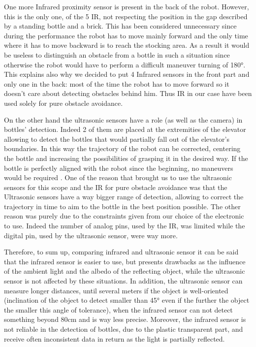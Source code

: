 One more Infrared proximity sensor is present in the back of the robot.
However, this is the only one, of the 5 IR, not respecting the position in the gap described by a standing bottle and a brick.
This has been considered unnecessary since during the performance the robot has to move mainly forward and the only time where it has to move backward is to reach the stocking area. As a result it would be useless to distinguish an obstacle from a bottle in such a situation since otherwise the robot would have to perform a difficult maneuver turning of 180°.
This explains also why we decided to put 4 Infrared sensors in the front part and only one in the back: most of the time the robot has to move forward so it doesn’t care about detecting obstacles behind him.
Thus IR in our case have been used solely for pure obstacle avoidance.

On the other hand the ultrasonic sensors have a role (as well as the camera) in bottles’ detection.
Indeed 2 of them are placed at the extremities of the elevator allowing to detect the bottles that would partially fall out of the elevator’s boundaries. In this way the trajectory of the robot can be corrected, centering the bottle and increasing the possibilities of grasping it in the desired way.
If the bottle is perfectly aligned with the robot since the beginning, no maneuvers would be required .
One of the reason that brought us to use the ultrasonic sensors for this scope and the IR for pure obstacle avoidance was that the Ultrasonic sensors have a way bigger range of detection, allowing to correct the trajectory in time to aim to the bottle in the best position possible.
The other reason was purely due to the constraints given from our choice of the electronic to use. Indeed the number of analog pins, used by the IR, was limited while the digital pin, used by the ultrasonic sensor, were way more.

Therefore, to sum up, comparing infrared and ultrasonic sensor it can be said that the infrared sensor is easier to use, but presents drawbacks as the influence of the ambient light and the albedo of the reflecting object, while the ultrasonic sensor is not affected by these situations. In addition, the ultrasonic sensor can measure longer distances, until
several meters if the object is well-oriented (inclination of the object to detect smaller than 45° even if the further the object the smaller this angle of tolerance), when the infrared sensor can not detect something beyond 80cm and is way less precise.
Moreover, the infrared sensor is not reliable in the detection of bottles, due to the plastic transparent part, and receive often inconsistent data in return as the light is partially reflected.

